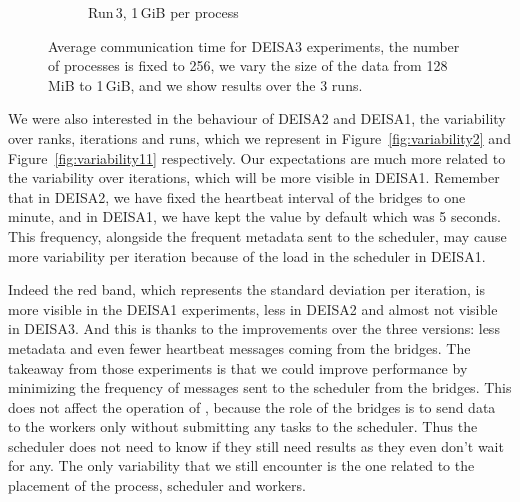 \begin{figure}
\begin{subfigure}[b]{0.3\textwidth}
         \caption{Run\,3, 1\,GiB per process}
         \label{fig:E3_1}
     \end{subfigure}
        \caption{Average communication time for DEISA3 experiments, the number of processes is fixed to 256, we vary the size of the data from 128\,MiB to 1\,GiB, and we show results over the 3 runs.}
        \label{fig:variability}
\end{figure}


We were also interested in the behaviour of DEISA2 and DEISA1, the variability over ranks, iterations and runs, which we represent in Figure~\ref{fig:variability2} and Figure~\ref{fig:variability11} respectively.  
Our expectations are much more related to the variability over iterations, which will be more visible in DEISA1. 
Remember that in DEISA2, we have fixed the heartbeat interval of the bridges to one minute, and in DEISA1, we have kept the value by default which was 5 seconds. This frequency, alongside the frequent metadata sent to the scheduler, may cause more variability per iteration because of the load in the scheduler in DEISA1.  

Indeed the red band, which represents the standard deviation per iteration, is more visible in the DEISA1 experiments, less in DEISA2 and almost not visible in DEISA3. And this is thanks to the improvements over the three versions: less metadata and even fewer heartbeat messages coming from the bridges.
The takeaway from those experiments is that we could improve performance by minimizing the frequency of messages sent to the scheduler from the bridges. This does not affect the operation of \dask, because the role of the bridges is to send data to the workers only without submitting any tasks to the scheduler. Thus the scheduler does not need to know if they still need results as they even don't wait for any. 
The only variability that we still encounter is the one related to the placement of the process, scheduler and workers. 

